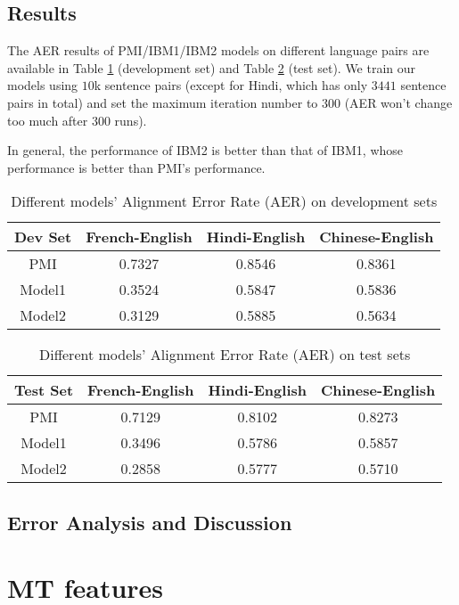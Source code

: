 \documentclass[letterpaper]{article}
\begin{document}
\subsection{Results}\label{sec:result}
The AER results of PMI/IBM1/IBM2 models on different language pairs are available in Table \ref{tab:dev_result} (development set) and Table \ref{tab:test_result}  (test set). We train our models using $10$k sentence pairs (except for Hindi, which has only $3441$ sentence pairs in total) and set the maximum iteration number to $300$ (AER won't change too much after $300$ runs).

In general, the performance of IBM2 is better than that of IBM1, whose performance is better than PMI's performance.

\begin{table}
\begin{center}
\begin{tabular}{cccc}
\hline
\textbf{Dev Set} & French-English & Hindi-English & Chinese-English \\
\hline
PMI & 0.7327 & 0.8546 & 0.8361 \\
Model1 & 0.3524 &  0.5847 &  0.5836 \\
Model2 & 0.3129 & 0.5885 & 0.5634 \\
\hline
\end{tabular}
\caption{Different models' Alignment Error Rate (AER) on development sets}\label{tab:dev_result}
\end{center}
\end{table}

\begin{table}
\begin{center}
\begin{tabular}{cccc}
\hline
\textbf{Test Set} & French-English & Hindi-English & Chinese-English \\
\hline
PMI & 0.7129 & 0.8102 & 0.8273 \\
Model1 & 0.3496 &  0.5786 &   0.5857 \\
Model2 & 0.2858 & 0.5777 & 0.5710 \\
\hline
\end{tabular}
\caption{Different models' Alignment Error Rate (AER) on test sets}\label{tab:test_result}
\end{center}
\end{table}


\subsection{Error Analysis and Discussion}

\section{MT features}



\end{document}
